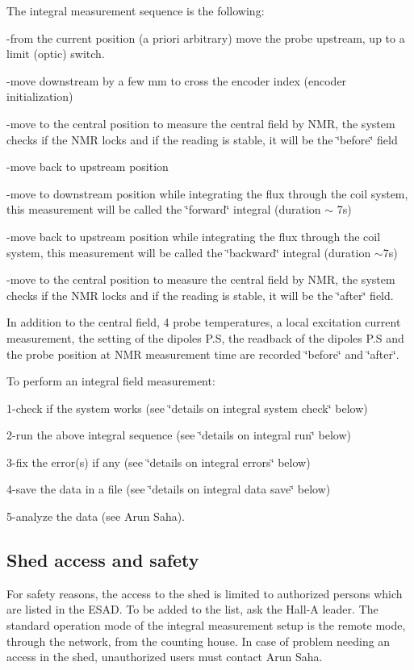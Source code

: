 The integral measurement sequence is the following: 

-from the current position (a priori arbitrary) move the probe upstream, up
to a limit (optic) switch. 

-move downstream by a few mm to cross the encoder index (encoder initialization) 

-move to the central position to measure the central field by NMR, the system
checks if the NMR locks and if the reading is stable, it will be the \char`\"{}before\char`\"{}
field 

-move back to upstream position 

-move to downstream position while integrating the flux through the coil system,
this measurement will be called the \char`\"{}forward\char`\"{} integral (duration
\( \sim  \) 7s) 

-move back to upstream position while integrating the flux through the coil
system, this measurement will be called the \char`\"{}backward\char`\"{} integral
(duration \( \sim  \)7s) 

-move to the central position to measure the central field by NMR, the system
checks if the NMR locks and if the reading is stable, it will be the \char`\"{}after\char`\"{}
field. 

In addition to the central field, 4 probe temperatures, a local excitation current
measurement, the setting of the dipoles P.S, the readback of the dipoles P.S
and the probe position at NMR measurement time are recorded \char`\"{}before\char`\"{}
and \char`\"{}after\char`\"{}. 

To perform an integral field measurement: 

1-check if the system works (see \char`\"{}details on integral system check\char`\"{}
below) 

2-run the above integral sequence (see \char`\"{}details on integral run\char`\"{}
below) 

3-fix the error(s) if any (see \char`\"{}details on integral errors\char`\"{}
below) 

4-save the data in a file (see \char`\"{}details on integral data save\char`\"{}
below) 

5-analyze the data (see Arun Saha). 


\subsection{Shed access and safety }

For safety reasons, the access to the shed is limited to authorized
persons which are listed in the ESAD. To be added to the list, ask the Hall-A leader. The standard
operation mode of the integral measurement setup is the remote mode, through
the network, from the counting house. In case of problem needing an access in
the shed, unauthorized users must contact Arun Saha.


